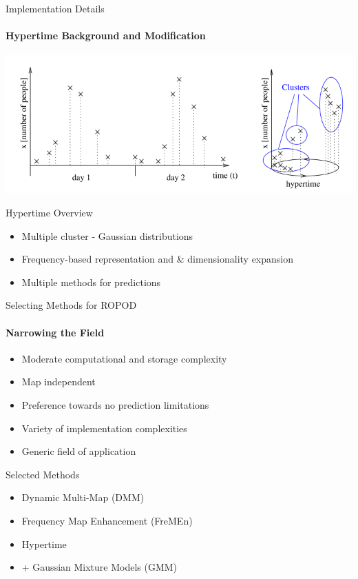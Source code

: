 \documentclass{beamer}
\begin{document}
\begin{frame}[t]{Implementation Details}
  \framesubtitle{Hypertime Background and Modification}
    \includegraphics[width=0.80\columnwidth]{images/hypertime_clustering.png}

    \begin{block}{Hypertime Overview}
      \begin{itemize}
        \item Multiple cluster - Gaussian distributions
        \item Frequency-based representation and \& dimensionality expansion
        \item Multiple methods for predictions
      \end{itemize}
    \end{block}
\end{frame}




\begin{frame}[t]{Selecting Methods for ROPOD}
  \framesubtitle{Narrowing the Field}
  \begin{itemize}
    \item Moderate computational and storage complexity
    \item Map independent
    \item Preference towards no prediction limitations
    \item Variety of implementation complexities
    \item Generic field of application
  \end{itemize}

    \begin{block}{Selected Methods}
      \begin{itemize}
        \item Dynamic Multi-Map (DMM) \cite{Biber2005}
        \item Frequency Map Enhancement (FreMEn) \cite{Krajnik2015}
        \item Hypertime \cite{Krajnik2018}
        \item + Gaussian Mixture Models (GMM) \cite{Krajnik2015}
      \end{itemize}
    \end{block}
\end{frame}
\end{document}
